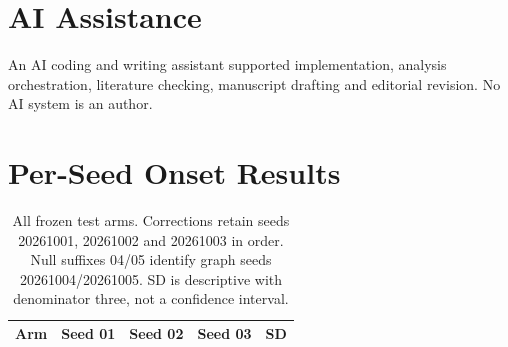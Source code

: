 \documentclass{llncs}
\begin{document}
\section*{AI Assistance}
An AI coding and writing assistant supported implementation, analysis orchestration, literature checking, manuscript drafting and editorial revision. No AI system is an author.



\appendix
\section{Per-Seed Onset Results}
\begin{table}[h]
\caption{All frozen test arms. Corrections retain seeds 20261001, 20261002 and 20261003 in order. Null suffixes 04/05 identify graph seeds 20261004/20261005. SD is descriptive with denominator three, not a confidence interval.}
\centering\small
\begin{tabular}{lrrrr}
\toprule
Arm & Seed 01 & Seed 02 & Seed 03 & SD\\
\midrule

\bottomrule
\end{tabular}
\end{table}
\end{document}
